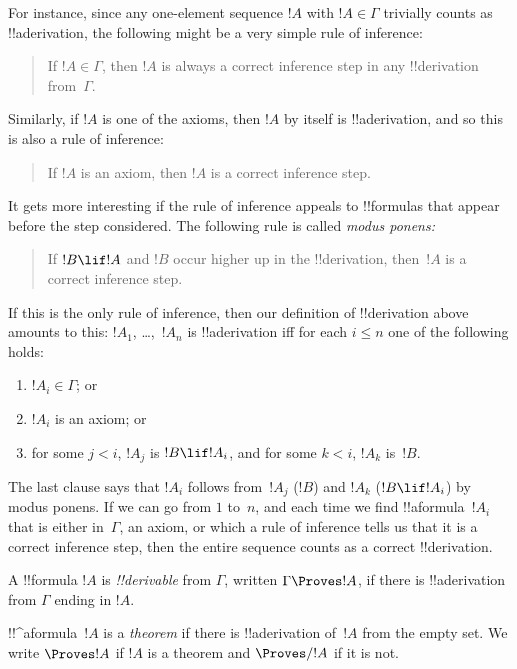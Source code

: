 \documentclass[../../include/open-logic-section]{subfiles}
\begin{document}
For instance, since any one-element sequence $!A$ with $!A \in \Gamma$
trivially counts as !!a{derivation}, the following might be a very
simple rule of inference:
\begin{quote}
  If $!A \in \Gamma$, then $!A$ is always a correct inference step in
  any !!{derivation} from~$\Gamma$.
\end{quote}
Similarly, if $!A$ is one of the axioms, then $!A$ by itself is
!!a{derivation}, and so this is also a rule of inference:
\begin{quote}
  If $!A$ is an axiom, then $!A$ is a correct inference step.
\end{quote}
It gets more interesting if the rule of inference appeals to
!!{formula}s that appear before the step considered. The following
rule is called \emph{modus ponens:}
\begin{quote}
  If $!B \lif !A$ and $!B$ occur higher up in the !!{derivation},
  then~$!A$ is a correct inference step.
\end{quote}
If this is the only rule of inference, then our definition of
!!{derivation} above amounts to this: $!A_1$, \dots,~$!A_n$ is
!!a{derivation} iff for each $i \le n$ one of the following holds:
\begin{enumerate}
\item $!A_i \in \Gamma$; or
\item $!A_i$ is an axiom; or
\item for some $j < i$, $!A_j$ is $!B \lif !A_i$, and for some $k < i$,
  $!A_k$ is~$!B$.
\end{enumerate}
The last clause says that $!A_i$ follows from~$!A_j$ ($!B$) and $!A_k$
($!B \lif !A_i$) by modus ponens. If we can go from $1$ to~$n$, and
each time we find !!a{formula}~$!A_i$ that is either in~$\Gamma$, an
axiom, or which a rule of inference tells us that it is a correct
inference step, then the entire sequence counts as a correct
!!{derivation}.

\begin{defn}[!!^{derivability}]
A !!{formula} $!A$ is \emph{!!{derivable}} from $\Gamma$, written
$\Gamma \Proves !A$, if there is !!a{derivation} from $\Gamma$ ending
in $!A$.
\end{defn}

\begin{defn}[Theorems]
!!^a{formula}~$!A$ is a \emph{theorem} if there is !!a{derivation}
of~$!A$ from the empty set.  We write $\Proves !A$ if $!A$ is a
theorem and $\Proves/ !A$ if it is not.
\end{defn}
\end{document}
